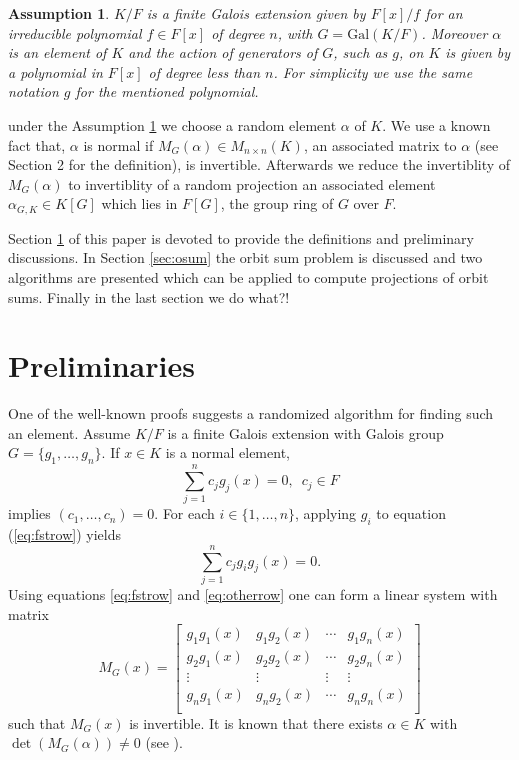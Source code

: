 \documentclass[sigconf]{acmart}
\newcommand{\osum}[2]{\alpha_{#1,#2}}
\theoremstyle{acmplain}
\newtheorem{assumption}{Assumption}
\begin{document}
\begin{assumption}\label{assum}
$K/F$ is a finite Galois extension given by $ F[x]/f$ for an irreducible polynomial $f\in F[x]$ of degree $n$, with
 $G = \mathrm{Gal}(K/F)$. Moreover $\alpha$ is an element of $K$ and the action of generators of $ G$, such as $g$, on $K$ is given by a polynomial in $F[x]$ of degree less than $n$. For simplicity we use the same notation $g$ for the mentioned 
 polynomial.
\end{assumption}

under the Assumption \ref{assum} we choose a random element $\alpha$ of $K$. We use a known fact that, $\alpha$ is normal 
if $M_G(\alpha) \in M_{n\times n}(K)$, an associated matrix to $\alpha$ (see Section 2 for the definition), is invertible. 
Afterwards we reduce the invertiblity of $M_G(\alpha)$ to invertiblity of a random projection an associated element 
$\osum{G}{K} \in K[G]$ which lies in $F[G]$, the group ring of $G$ over $F$. 

Section \ref{sec:pre} of this paper is devoted to provide the definitions and preliminary discussions. In Section \ref{sec:osum} 
the orbit sum problem is discussed and two algorithms are presented which can be applied to compute projections of orbit sums.
Finally in the last section we do what?!


\section{Preliminaries} \label{sec:pre}
One of the well-known proofs suggests a randomized algorithm for finding such an element. 
Assume $K/F$ is a finite Galois extension with Galois group $G = \lbrace g_1 , \ldots ,
 g_n \rbrace$. If $x \in K$ is a normal element, 
 \begin{equation}\label{eq:fstrow}
 \sum_{j=1}^n 
 c_j g_j(x)=0, \,\,\, c_j \in F 
 \end{equation} 
 implies $(c_1, \ldots ,c_n) = 0$. For each $i \in \lbrace 1, \ldots , n\rbrace$, applying $g_i$ to equation (\ref{eq:fstrow}) yields
\begin{equation} \label{eq:otherrow}
 \sum_{j=1}^n 
 c_j g_i g_j(x)=0.
 \end{equation}
 Using equations \ref{eq:fstrow} and \ref{eq:otherrow} one can form a linear system with 
 matrix 
 $$ M_G(x) =
\begin{bmatrix}
g_1 g_1(x) & g_1 g_2(x) & \cdots & g_1 g_n(x) \\
g_2 g_1(x) & g_2 g_2(x) & \cdots & g_2 g_n(x) \\
\vdots		& \vdots	& \vdots & \vdots \\
g_n g_1(x) & g_n g_2(x) & \cdots & g_n g_n(x) \\
\end{bmatrix} 
 $$
 such that $M_G(x)$ is invertible. It is known that there exists $\alpha \in K$ with 
 $\det(M_G(\alpha))\neq 0$  (see \cite[Theorem 6.13.1]{Lang}).
 
\end{document}
